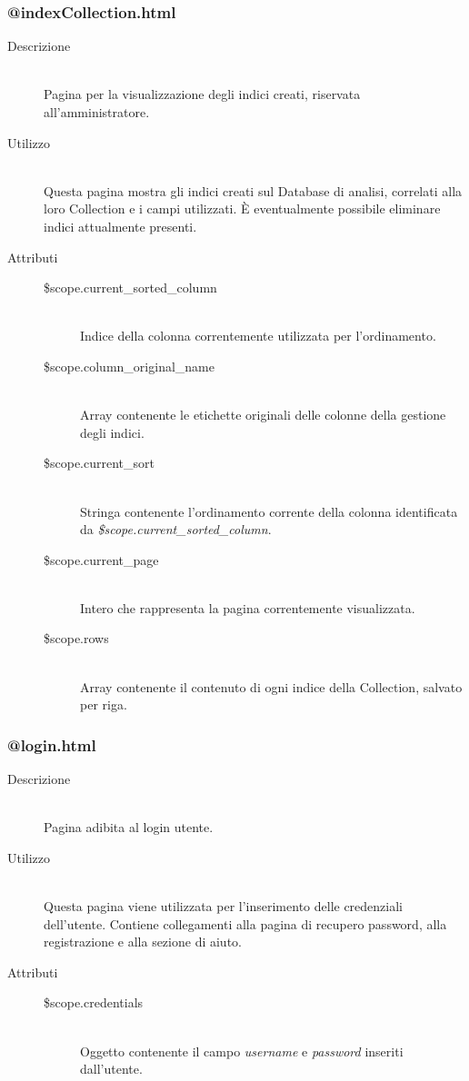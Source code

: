 \subsubsection{@indexCollection.html}
\begin{description}
	\item[Descrizione] \hfill \\
	Pagina per la visualizzazione degli indici creati, riservata all'amministratore.
	\item[Utilizzo] \hfill \\
	Questa pagina mostra gli indici creati sul Database di analisi, correlati alla loro Collection e i campi utilizzati. \`{E} eventualmente possibile eliminare indici attualmente presenti.
	\item[Attributi] \hfill
 	\begin{description}
 		\item[\$scope.current\_sorted\_column] \hfill \\
 		Indice della colonna correntemente utilizzata per l'ordinamento.
 		\item[\$scope.column\_original\_name] \hfill \\
		Array contenente le etichette originali delle colonne della gestione degli indici.
		\item[\$scope.current\_sort] \hfill \\
		Stringa contenente l'ordinamento corrente della colonna identificata da \textit{\$scope.current\_sorted\_column}.
		\item[\$scope.current\_page] \hfill \\
		Intero che rappresenta la pagina correntemente visualizzata.
		\item[\$scope.rows] \hfill \\
		Array contenente il contenuto di ogni indice della Collection, salvato per riga.
 	\end{description}
\end{description}

\subsubsection{@login.html}
\begin{description}
	\item[Descrizione] \hfill \\
	Pagina adibita al login utente.
	\item[Utilizzo] \hfill \\
	Questa pagina viene utilizzata per l'inserimento delle credenziali dell'utente. Contiene collegamenti alla pagina di recupero password, alla registrazione e alla sezione di aiuto.
	\item[Attributi] \hfill
 	\begin{description}
 		\item[\$scope.credentials] \hfill \\
 		Oggetto contenente il campo \textit{username} e \textit{password} inseriti dall'utente.
 	\end{description}
\end{description}


